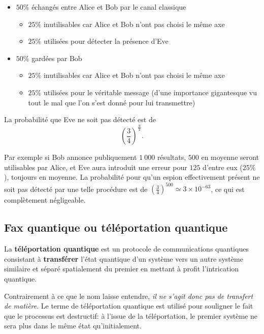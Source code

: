 \begin{itemize}
\item $50\%$ échangés entre Alice et Bob par le canal classique
\begin{itemize}
\item $25\%$ inutilisables car Alice et Bob n'ont pas choisi le même axe
\item $25\%$ utilisées pour détecter la présence d'Eve
\end{itemize}
\item $50\%$ gardées par Bob
\begin{itemize}
\item $25\%$ inutilisables car Alice et Bob n'ont pas choisi le même axe
\item $25\%$ utilisées pour le véritable message (d'une importance gigantesque
vu tout le mal que
l'on s'est donné pour lui transmettre)
\end{itemize}
\end{itemize}

La probabilité que Eve ne soit pas détecté est de
\begin{equation}
\left(\frac{3}{4}\right)^{\frac{N}{4}}.
\end{equation}

Par exemple si Bob annonce publiquement $1\ 000$ résultats, $500$ en moyenne
seront utilisables par Alice, et Eve aura introduit une erreur pour $125$
d'entre eux ($25\%$), toujours en moyenne. La probabilité pour qu'un espion
effectivement présent ne soit pas détecté par une telle procédure est de
$(\frac{3}{4})^{500}\simeq\allowbreak3\times10^{-63}$, ce qui est complètement
négligeable.


\subsection{Fax quantique ou téléportation quantique}
\label{sec:TelQ}

\colorbox[gray]{0.8}{
\parbox[c]{0.9\textwidth}{
\begin{definition}
La \textbf{téléportation quantique} est un protocole de communications
quantiques consistant à \textbf{transférer} l'état quantique d'un système vers
un autre système similaire et séparé spatialement du premier en mettant à profit
l'intrication quantique.
\end{definition}
}}\medskip

Contrairement à ce que le nom laisse entendre, \emph{il ne s'agit donc pas de
transfert de matière}. Le terme de téléportation quantique est utilisé pour
souligner le fait que le processus est destructif: à l'issue de la
téléportation, le premier système ne sera plus dans le même état
qu'initialement.

